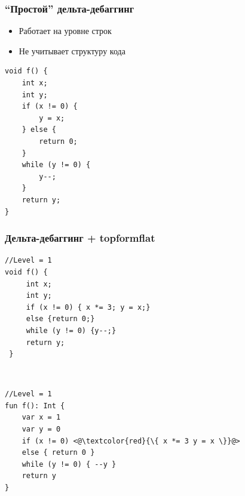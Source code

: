 \begin{frame}[fragile]
	\frametitle{``Простой'' дельта-дебаггинг}
	\begin{itemize}
		\item Работает на уровне строк
		\item Не учитывает структуру кода
	\end{itemize}
	\begin{lstlisting}[style=crs_cpp]
void f() {
    int x;
    int y;
    if (x != 0) {
        y = x;
    } else {
        return 0;
    }
    while (y != 0) {
        y--;
    }
    return y;
}
\end{lstlisting}
\end{frame}

\begin{frame}[fragile]
	\frametitle{Дельта-дебаггинг + topformflat}
	\begin{minipage}{0.4\linewidth}
		\begin{lstlisting}[style=crs_cpp]
//Level = 1
void f() {
     int x;
     int y;
     if (x != 0) { x *= 3; y = x;}
     else {return 0;}
     while (y != 0) {y--;}
     return y;
 }
 \end{lstlisting}
	\end{minipage}
	\begin{minipage}{0.1\linewidth}
	\ \ 
	\end{minipage}
	\begin{minipage}{0.4\linewidth}
		\begin{lstlisting}[style=crs_cpp]
//Level = 1
fun f(): Int {
    var x = 1
    var y = 0
    if (x != 0) <@\textcolor{red}{\{ x *= 3 y = x \}}@>
    else { return 0 }
    while (y != 0) { --y }
    return y
}
 \end{lstlisting}
	\end{minipage}
	\\ \
\end{frame}


